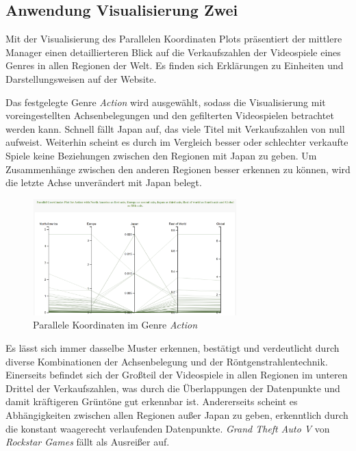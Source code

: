 \documentclass[usegeometry=true]{scrartcl}
\begin{document}
\subsection{Anwendung Visualisierung Zwei}
Mit der Visualisierung des Parallelen Koordinaten Plots präsentiert der mittlere Manager einen detaillierteren Blick auf die Verkaufszahlen der Videospiele eines Genres in allen Regionen der Welt.
Es finden sich Erklärungen zu Einheiten und Darstellungsweisen auf der Website.

Das festgelegte Genre \textit{Action} wird ausgewählt, sodass die Visualisierung mit voreingestellten Achsenbelegungen 
und den gefilterten Videospielen betrachtet werden kann. 
Schnell fällt Japan auf, das viele Titel mit Verkaufszahlen von null aufweist. 
Weiterhin scheint es durch im Vergleich besser oder schlechter verkaufte Spiele keine Beziehungen zwischen den Regionen mit Japan zu geben.
Um Zusammenhänge zwischen den anderen Regionen besser erkennen zu können, wird die letzte Achse unverändert mit Japan belegt.
\begin{figure}[h]
        \centering
        \includegraphics[height=4.5cm]{Bilder/ParallelPlot_Action.png}
        \caption{Parallele Koordinaten im Genre \textit{Action}}
        \label{fig:ParallelPlotAction}
\end{figure}
Es lässt sich immer dasselbe Muster erkennen, bestätigt und verdeutlicht durch diverse Kombinationen der Achsenbelegung und der Röntgenstrahlentechnik.
Einerseits befindet sich der Großteil der Videospiele in allen Regionen im unteren Drittel der Verkaufszahlen, was durch die Überlappungen der Datenpunkte und damit kräftigeren Grüntöne gut erkennbar ist.
Andererseits scheint es Abhängigkeiten zwischen allen Regionen außer Japan zu geben, erkenntlich durch die konstant waagerecht verlaufenden Datenpunkte.
\textit{Grand Theft Auto V} von \textit{Rockstar Games} fällt als Ausreißer auf. 
\end{document}
